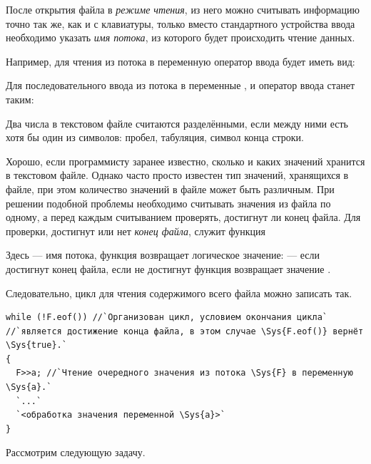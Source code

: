 После открытия файла в \emph{режиме чтения}, из него можно считывать информацию точно так же, как и с
клавиатуры, только вместо стандартного устройства ввода  необходимо указать
\emph{имя потока}, из которого будет происходить чтение данных.

Например, для чтения из потока  в переменную  оператор ввода будет иметь вид:


Для последовательного ввода из потока  в переменные ,  и
 оператор ввода станет таким:


Два числа в текстовом файле считаются разделёнными, если между ними есть хотя бы один из символов: пробел, табуляция,
символ конца строки.

Хорошо, если программисту заранее известно, сколько и каких значений хранится в текстовом файле. Однако часто просто
известен тип значений, хранящихся в файле, при этом количество значений в файле может быть различным. При решении
подобной проблемы необходимо считывать значения из файла по одному, а перед каждым считыванием проверять, достигнут ли
конец файла. Для проверки, достигнут или нет \emph{конец файла}, служит функция 


Здесь  --- имя потока, функция возвращает логическое значение:  --- если
достигнут конец файла, если не достигнут функция возвращает значение .

Следовательно, цикл для чтения содержимого всего файла можно записать так.
\begin{lstlisting}
while (!F.eof()) //`Организован цикл, условием окончания цикла`
//`является достижение конца файла, в этом случае \Sys{F.eof()} вернёт \Sys{true}.`
{
  F>>a;	//`Чтение очередного значения из потока \Sys{F} в переменную \Sys{a}.`
  `...`
  `<обработка значения переменной \Sys{a}>`
}
\end{lstlisting}

Рассмотрим следующую задачу.


